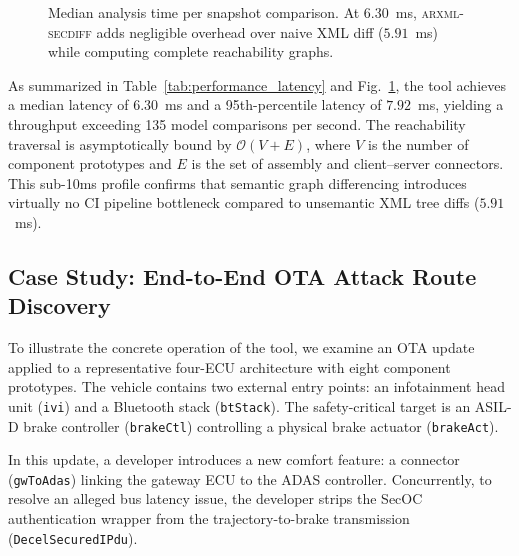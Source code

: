 \documentclass[journal]{IEEEtran}
\begin{document}
\begin{figure}[t]
\centering
{}
\caption{Median analysis time per snapshot comparison. At $6.30$~ms, \textsc{arxml-secdiff} adds negligible overhead over naive XML diff ($5.91$~ms) while computing complete reachability graphs.}
\label{fig:runtime}
\end{figure}

As summarized in Table~\ref{tab:performance_latency} and Fig.~\ref{fig:runtime}, the tool achieves a median latency of $6.30$~ms and a 95th-percentile latency of $7.92$~ms, yielding a throughput exceeding 135 model comparisons per second. The reachability traversal is asymptotically bound by $\mathcal{O}(V + E)$, where $V$ is the number of component prototypes and $E$ is the set of assembly and client--server connectors. This sub-10ms profile confirms that semantic graph differencing introduces virtually no CI pipeline bottleneck compared to unsemantic XML tree diffs ($5.91$~ms).

\subsection{Case Study: End-to-End OTA Attack Route Discovery}
\label{subsec:case}

To illustrate the concrete operation of the tool, we examine an OTA update applied to a representative four-ECU architecture with eight component prototypes. The vehicle contains two external entry points: an infotainment head unit (\texttt{ivi}) and a Bluetooth stack (\texttt{btStack}). The safety-critical target is an ASIL-D brake controller (\texttt{brakeCtl}) controlling a physical brake actuator (\texttt{brakeAct}).

In this update, a developer introduces a new comfort feature: a connector (\texttt{gwToAdas}) linking the gateway ECU to the ADAS controller. Concurrently, to resolve an alleged bus latency issue, the developer strips the SecOC authentication wrapper from the trajectory-to-brake transmission (\texttt{DecelSecuredIPdu}).
\end{document}

